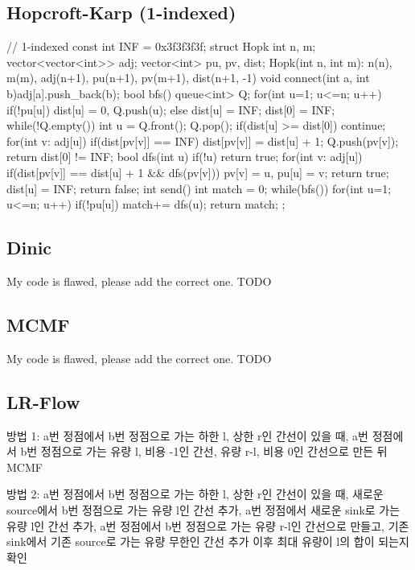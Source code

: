\subsection{Hopcroft-Karp (1-indexed)}
\begin{cpp}
// 1-indexed
const int INF = 0x3f3f3f3f;
struct Hopk{
  int n, m; vector<vector<int>> adj;
  vector<int> pu, pv, dist;
  Hopk(int n, int m): n(n), m(m), adj(n+1),
    pu(n+1), pv(m+1), dist(n+1, -1) {}
  void connect(int a, int b){adj[a].push_back(b);}
  bool bfs(){
    queue<int> Q;
    for(int u=1; u<=n; u++){
      if(!pu[u]) dist[u] = 0, Q.push(u);
      else dist[u] = INF;
    }
    dist[0] = INF;
    while(!Q.empty()){
      int u = Q.front(); Q.pop();
      if(dist[u] >= dist[0]) continue;
      for(int v: adj[u]) if(dist[pv[v]] == INF){
        dist[pv[v]] = dist[u] + 1;
        Q.push(pv[v]);
      }
    }
    return dist[0] != INF;
  }
  bool dfs(int u){
    if(!u) return true;
    for(int v: adj[u])
      if(dist[pv[v]] == dist[u] + 1 && dfs(pv[v])){
        pv[v] = u, pu[u] = v; return true;
    }
    dist[u] = INF;
    return false;
  }
  int send(){
    int match = 0;
    while(bfs()) for(int u=1; u<=n; u++)
      if(!pu[u]) match+= dfs(u);
    return match;
  }
};
\end{cpp}

\subsection{Dinic}
My code is flawed, please add the correct one. TODO

\subsection{MCMF}
My code is flawed, please add the correct one. TODO

\subsection{LR-Flow}
방법 1: a번 정점에서 b번 정점으로 가는 하한 l, 상한 r인 간선이 있을 때, a번 정점에서 b번 정점으로 가는 유량 l, 비용 -1인 간선, 유량 r-l, 비용 0인 간선으로 만든 뒤 MCMF

방법 2: a번 정점에서 b번 정점으로 가는 하한 l, 상한 r인 간선이 있을 때, 새로운 source에서 b번 정점으로 가는 유량 l인 간선 추가, a번 정점에서 새로운 sink로 가는 유량 l인 간선 추가, a번 정점에서 b번 정점으로 가는 유량 r-l인 간선으로 만들고, 기존 sink에서 기존 source로 가는 유량 무한인 간선 추가 이후 최대 유량이 l의 합이 되는지 확인

